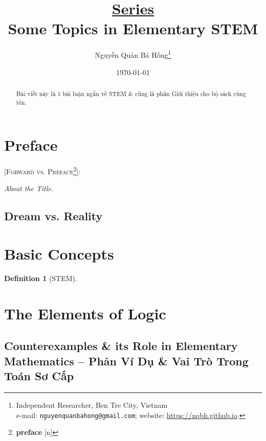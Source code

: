 \documentclass{article}
\title{\underline{\textbf{Series}}\\Some Topics in Elementary STEM}
\author{\selectlanguage{vietnamese} Nguyễn Quản Bá Hồng\footnote{Independent Researcher, Ben Tre City, Vietnam\\e-mail: \texttt{nguyenquanbahong@gmail.com}; website: \url{https://nqbh.github.io}.}}
\date{\today}
\numberwithin{equation}{section}
\newtheorem{definition}{Definition}[section]
\begin{document}
\maketitle
{}
\begin{abstract}
	Bài viết này là 1 bài luận ngắn về STEM \& cũng là phần Giới thiệu cho bộ sách cùng tên.
\end{abstract}

\tableofcontents
{}


\section{Preface}
\textsc{[Forward vs. Preface\footnote{\textbf{preface}  [n]}]:}

\textit{About the Title.}

\subsection{Dream vs. Reality}

\section{Basic Concepts}

\begin{definition}[STEM]
	
\end{definition}

\section{The Elements of Logic}

\subsection{Counterexamples \& its Role in Elementary Mathematics -- Phản Ví Dụ \& Vai Trò Trong Toán Sơ Cấp}
\end{document}
